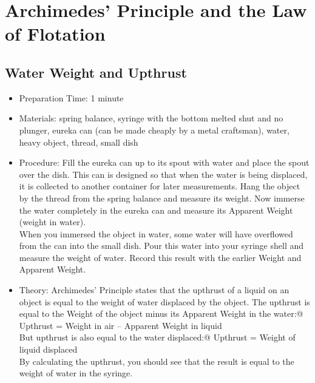 \section{Archimedes' Principle and the Law of Flotation}


\subsection{Water Weight and Upthrust}
\begin{itemize}
\item{Preparation Time: 1 minute}
\item{Materials: spring balance, syringe with the bottom melted shut and no plunger, eureka can (can be made cheaply by a metal craftsman), water, heavy object, thread, small dish}
\item{Procedure: Fill the eureka can up to its spout with water and place the spout over the dish. This can is designed so that when the water is being displaced, it is collected to another container for later measurements. Hang the object by the thread from the spring balance and measure its weight. Now immerse the water completely in the eureka can and measure its Apparent Weight (weight in water).\\
When you immersed the object in water, some water will have overflowed from the can into the small dish. Pour this water into your syringe shell and measure the weight of water. Record this result with the earlier Weight and Apparent Weight.}
\item{Theory: Archimedes’ Principle states that the upthrust of a liquid on an object is equal to the weight of water displaced by the object. The upthrust is equal to the Weight of the object minus its Apparent Weight in the water:@	Upthrust = Weight in air – Apparent Weight in liquid\\
But upthrust is also equal to the water displaced:@	Upthrust = Weight of liquid displaced\\
By calculating the upthrust, you should see that the result is equal to the weight of water in the syringe.}
\end{itemize}




